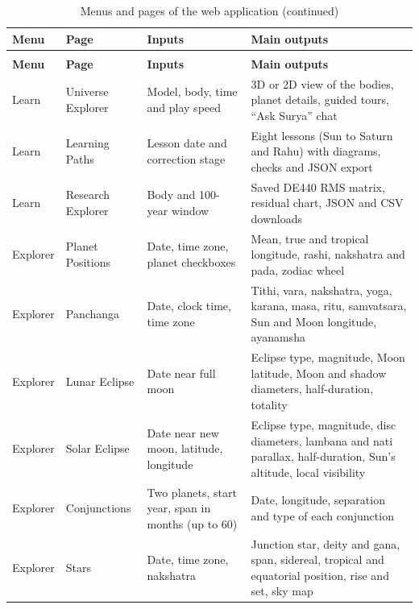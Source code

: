\documentclass[12pt,a4paper,oneside]{report}
\begin{document}
\begin{longtable}[]{@{}
  >{\raggedright\arraybackslash}p{}
  >{\raggedright\arraybackslash}p{}
  >{\raggedright\arraybackslash}p{}
  >{\raggedright\arraybackslash}p{}@{}}
\caption{Menus and pages of the web application}\label{tab:ui-menus}\\
\toprule\noalign{}
\textbf{Menu} & \textbf{Page} & \textbf{Inputs} & \textbf{Main outputs} \\
\midrule\noalign{}
\endfirsthead
\caption[]{Menus and pages of the web application (continued)}\\
\toprule\noalign{}
\textbf{Menu} & \textbf{Page} & \textbf{Inputs} & \textbf{Main outputs} \\
\midrule\noalign{}
\endhead
\bottomrule\noalign{}
\endlastfoot
Learn & Universe Explorer & Model, body, time and play speed & 3D or 2D
view of the bodies, planet details, guided tours, ``Ask Surya''
chat \\
Learn & Learning Paths & Lesson date and correction stage & Eight
lessons (Sun to Saturn and Rahu) with diagrams, checks and JSON
export \\
Learn & Research Explorer & Body and 100-year window & Saved DE440 RMS
matrix, residual chart, JSON and CSV downloads \\
Explorer & Planet Positions & Date, time zone, planet checkboxes & Mean,
true and tropical longitude, rashi, nakshatra and pada, zodiac
wheel \\
Explorer & Panchanga & Date, clock time, time zone & Tithi, vara,
nakshatra, yoga, karana, masa, ritu, samvatsara, Sun and Moon
longitude, ayanamsha \\
Explorer & Lunar Eclipse & Date near full moon & Eclipse type,
magnitude, Moon latitude, Moon and shadow diameters, half-duration,
totality \\
Explorer & Solar Eclipse & Date near new moon, latitude, longitude &
Eclipse type, magnitude, disc diameters, lambana and nati parallax,
half-duration, Sun's altitude, local visibility \\
Explorer & Conjunctions & Two planets, start year, span in months (up
to 60) & Date, longitude, separation and type of each conjunction \\
Explorer & Stars & Date, time zone, nakshatra & Junction star, deity
and gana, span, sidereal, tropical and equatorial position, rise and
set, sky map \\

\end{longtable}
\end{document}

